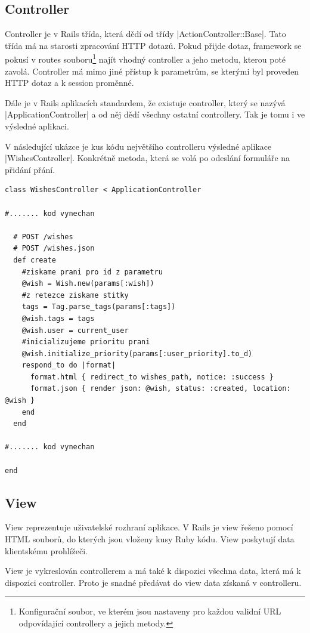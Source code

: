 \subsection{Controller}
Controller je v Rails třída, která dědí od třídy |ActionController::Base|. Tato třída má na starosti zpracování HTTP dotazů. Pokud přijde dotaz, framework se pokusí v routes souboru\footnote{Konfigurační soubor, ve kterém jsou nastaveny pro každou validní URL odpovídající controllery a jejich metody.} najít vhodný controller a jeho metodu, kterou poté zavolá. Controller má mimo jiné přístup k parametrům, se kterými byl proveden HTTP dotaz a k session proměnné.

Dále je v Rails aplikacích standardem, že existuje controller, který se nazývá |ApplicationController| a od něj dědí všechny ostatní controllery. Tak je tomu i ve výsledné aplikaci.

V následující ukázce je kus kódu největšího controlleru výsledné aplikace |WishesController|. Konkrétně metoda, která se volá po odeslání formuláře na přidání přání.

\lstset{language = ruby, style=custom}
\begin{lstlisting}
class WishesController < ApplicationController

#....... kod vynechan

  # POST /wishes
  # POST /wishes.json
  def create
    #ziskame prani pro id z parametru
    @wish = Wish.new(params[:wish])
    #z retezce ziskame stitky
    tags = Tag.parse_tags(params[:tags])
    @wish.tags = tags
    @wish.user = current_user
    #inicializujeme prioritu prani
    @wish.initialize_priority(params[:user_priority].to_d)
    respond_to do |format|
      format.html { redirect_to wishes_path, notice: :success }
      format.json { render json: @wish, status: :created, location: @wish }
    end
  end

#....... kod vynechan

end
\end{lstlisting}

\subsection{View}
View reprezentuje uživatelské rozhraní aplikace. V Rails je view řešeno pomocí HTML souborů, do kterých jsou vloženy kusy Ruby kódu. View poskytují data klientskému prohlížeči.

View je vykreslován controllerem a má také k dispozici všechna data, která má k dispozici controller. Proto je snadné předávat do view data získaná v controlleru.

